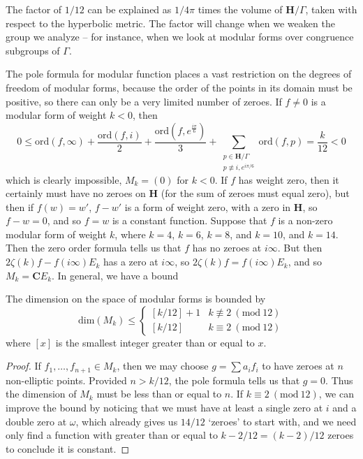 The factor of $1/12$ can be explained as $1/4\pi$ times the volume of $\mathbf{H}/\Gamma$, taken with respect to the hyperbolic metric. The factor will change when we weaken the group we analyze -- for instance, when we look at modular forms over congruence subgroups of $\Gamma$.

The pole formula for modular function places a vast restriction on the degrees of freedom of modular forms, because the order of the points in its domain must be positive, so there can only be a very limited number of zeroes. If $f \neq 0$ is a modular form of weight $k < 0$, then
%
\[ 0 \leq \text{ord}(f,\infty) + \frac{\text{ord}(f,i)}{2} + \frac{\text{ord}(f,e^{\frac{i \pi}{6}})}{3} + \sum_{\substack{p \in \mathbf{H}/\Gamma\\p \not \equiv i, e^{i \pi/6}}} \text{ord}(f,p) = \frac{k}{12} < 0 \]
%
which is clearly impossible, $M_k = (0)$ for $k < 0$. If $f$ has weight zero, then it certainly must have no zeroes on $\mathbf{H}$ (for the sum of zeroes must equal zero), but then if $f(w) = w'$, $f - w'$ is a form of weight zero, with a zero in $\mathbf{H}$, so $f - w = 0$, and so $f = w$ is a constant function. Suppose that $f$ is a non-zero modular form of weight $k$, where $k = 4$, $k = 6$, $k = 8$, and $k = 10$, and $k = 14$. Then the zero order formula tells us that $f$ has no zeroes at $i \infty$. But then $2 \zeta(k) f - f(i \infty) E_k$ has a zero at $i \infty$, so $2 \zeta(k) f =  f(i \infty) E_k$, and so $M_k = \mathbf{C} E_k$. In general, we have a bound

\begin{theorem}
    The dimension on the space of modular forms is bounded by
    \[ \text{dim}(M_k) \leq \begin{cases} [k/12] + 1 & k \not \equiv 2\ (\text{mod}\ 12) \\ [k/12] & k \equiv 2\ (\text{mod}\ 12) \end{cases} \]
    where $[x]$ is the smallest integer greater than or equal to $x$.
\end{theorem}
\begin{proof}
    If $f_1, \dots, f_{n+1} \in M_k$, then we may choose $g = \sum a_i f_i$ to have zeroes at $n$ non-elliptic points. Provided $n > k/12$, the pole formula tells us that $g = 0$. Thus the dimension of $M_k$ must be less than or equal to $n$. If $k \equiv 2\ (\text{mod}\ 12)$, we can improve the bound by noticing that we must have at least a single zero at $i$ and a double zero at $\omega$, which already gives us $14/12$ `zeroes' to start with, and we need only find a function with greater than or equal to $k - 2/12 = (k-2)/12$ zeroes to conclude it is constant.
\end{proof}

